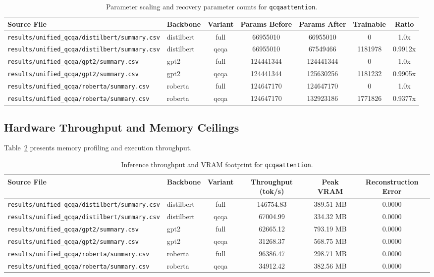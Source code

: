 \begin{table}[t]
\centering
\small
\begin{tabular}{llccccc}
\toprule
\textbf{Source File} & \textbf{Backbone} & \textbf{Variant} & \textbf{Params Before} & \textbf{Params After} & \textbf{Trainable} & \textbf{Ratio} \\
\midrule
\texttt{results/unified\_qcqa/distilbert/summary.csv} & distilbert & full & 66955010 & 66955010 & 0 & 1.0x \\
\texttt{results/unified\_qcqa/distilbert/summary.csv} & distilbert & qcqa & 66955010 & 67549466 & 1181978 & 0.9912x \\
\texttt{results/unified\_qcqa/gpt2/summary.csv} & gpt2 & full & 124441344 & 124441344 & 0 & 1.0x \\
\texttt{results/unified\_qcqa/gpt2/summary.csv} & gpt2 & qcqa & 124441344 & 125630256 & 1181232 & 0.9905x \\
\texttt{results/unified\_qcqa/roberta/summary.csv} & roberta & full & 124647170 & 124647170 & 0 & 1.0x \\
\texttt{results/unified\_qcqa/roberta/summary.csv} & roberta & qcqa & 124647170 & 132923186 & 1771826 & 0.9377x \\
\bottomrule
\end{tabular}
\caption{Parameter scaling and recovery parameter counts for \texttt{qcqaattention}.}
\label{tab:results_params_qcqaattention}
\end{table}

\subsection{Hardware Throughput and Memory Ceilings}
Table~\ref{tab:results_vram_qcqaattention} presents memory profiling and execution throughput.

\begin{table}[t]
\centering
\small
\begin{tabular}{llcccc}
\toprule
\textbf{Source File} & \textbf{Backbone} & \textbf{Variant} & \textbf{Throughput (tok/s)} & \textbf{Peak VRAM} & \textbf{Reconstruction Error} \\
\midrule
\texttt{results/unified\_qcqa/distilbert/summary.csv} & distilbert & full & 146754.83 & 389.51 MB & 0.0000 \\
\texttt{results/unified\_qcqa/distilbert/summary.csv} & distilbert & qcqa & 67004.99 & 334.32 MB & 0.0000 \\
\texttt{results/unified\_qcqa/gpt2/summary.csv} & gpt2 & full & 62665.12 & 793.19 MB & 0.0000 \\
\texttt{results/unified\_qcqa/gpt2/summary.csv} & gpt2 & qcqa & 31268.37 & 568.75 MB & 0.0000 \\
\texttt{results/unified\_qcqa/roberta/summary.csv} & roberta & full & 96386.47 & 298.71 MB & 0.0000 \\
\texttt{results/unified\_qcqa/roberta/summary.csv} & roberta & qcqa & 34912.42 & 382.56 MB & 0.0000 \\
\bottomrule
\end{tabular}
\caption{Inference throughput and VRAM footprint for \texttt{qcqaattention}.}
\label{tab:results_vram_qcqaattention}
\end{table}


